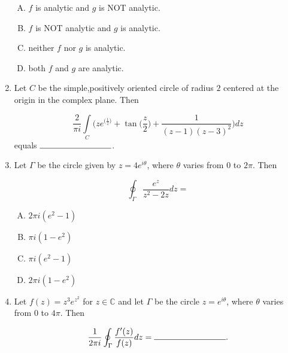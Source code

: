 \documentclass[12pt,a4paper]{article}
\begin{document}
\begin{enumerate}
\begin{enumerate}[(A)]

\item
$f$ is analytic and $g$ is NOT analytic.

\item
$f$ is NOT analytic and $g$ is analytic.

\item
neither $f$ nor $g$ is analytic.

\item
both $f$ and $g$ are analytic.

\end{enumerate}

\item Let $C$ be the simple,positively oriented circle of radius $2$ centered at the origin in the complex plane. Then

$$\frac{2}{\pi i} \int\limits_{C} \Bigg( z e^{\big(\frac{1}{z}\big)} + \tan \bigg(\frac{z}{2} \bigg) + \frac{1}{(z-1)(z-3)^2} \Bigg) dz $$ equals $\rule{3cm}{0.15mm}$. 

\item Let $\Gamma $ be the circle given by $z=4 e^{i \theta}$, where $\theta$ varies from $ 0 $ to $ 2 \pi $. Then

$$ \oint_{\Gamma} \frac{e^z}{z^2-2z} dz = $$

\begin{enumerate}[(A)]

\item $
2 \pi i (e^2-1)
$

\item $
\pi i (1-e^2)
$

\item $
\pi i (e^2-1)
$

\item $
2 \pi i (1-e^2)
$
\end{enumerate}

\item Let $f(z)= z^3e^{z^2}$ for $z \in \mathbb{C}$ and let $\Gamma$ be the circle $z= e^{i \theta}$, where $\theta$ varies from $0$ to $4 \pi $. Then

$$ \frac{1}{2 \pi i} \oint_{\Gamma} \frac{f'(z)}{f(z)} dz= \rule{3cm}{0.15mm}.$$

\end{enumerate}
\end{document}
